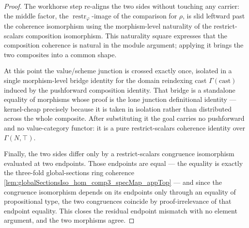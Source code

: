 \begin{proof}
  The workhorse step re-aligns the two sides without touching any carrier: the middle
  factor, the \(\operatorname{restr}_\varphi\)-image of the comparison for \(\rho\), is
  slid leftward past the coherence isomorphism using the morphism-level naturality of the
  restrict-scalars composition isomorphism. This naturality square expresses that the
  composition coherence is natural in the module argument; applying it brings the two
  composites into a common shape.

  At this point the value/scheme junction is crossed exactly once, isolated in a single
  morphism-level bridge identity for the domain reindexing cast \(\Gamma(\text{cast})\)
  induced by the pushforward composition identity. That bridge is a standalone equality of
  morphisms whose proof is the lone junction definitional identity — kernel-cheap precisely
  because it is taken in isolation rather than distributed across the whole composite.
  After substituting it the goal carries no pushforward and no value-category functor: it
  is a pure restrict-scalars coherence identity over \(\Gamma(N,\top)\).

  Finally, the two sides differ only by a restrict-scalars congruence isomorphism evaluated
  at two endpoints. Those endpoints are equal — the equality is exactly the three-fold
  global-sections ring coherence \cref{lem:globalSectionsIso_hom_comp3_specMap_appTop} — and
  since the congruence isomorphism depends on its endpoints only through an equality of
  propositional type, the two congruences coincide by proof-irrelevance of that endpoint
  equality. This closes the residual endpoint mismatch with no element argument, and the
  two morphisms agree.


\end{proof}

